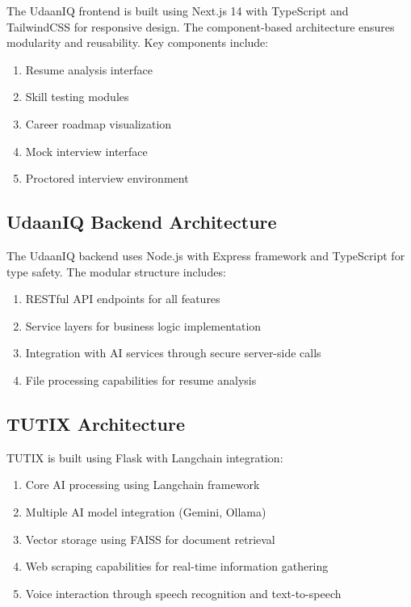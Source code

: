 \documentclass[12pt, conference]{IEEEtran}
\begin{document}
The UdaanIQ frontend is built using Next.js 14 with TypeScript and TailwindCSS for responsive design. The component-based architecture ensures modularity and reusability. Key components include:
\begin{enumerate}
    \item Resume analysis interface
    \item Skill testing modules
    \item Career roadmap visualization
    \item Mock interview interface
    \item Proctored interview environment
\end{enumerate}

\subsection{UdaanIQ Backend Architecture}

The UdaanIQ backend uses Node.js with Express framework and TypeScript for type safety. The modular structure includes:
\begin{enumerate}
    \item RESTful API endpoints for all features
    \item Service layers for business logic implementation
    \item Integration with AI services through secure server-side calls
    \item File processing capabilities for resume analysis
\end{enumerate}

\subsection{TUTIX Architecture}

TUTIX is built using Flask with Langchain integration:
\begin{enumerate}
    \item Core AI processing using Langchain framework
    \item Multiple AI model integration (Gemini, Ollama)
    \item Vector storage using FAISS for document retrieval
    \item Web scraping capabilities for real-time information gathering
    \item Voice interaction through speech recognition and text-to-speech
\end{enumerate}
\end{document}

